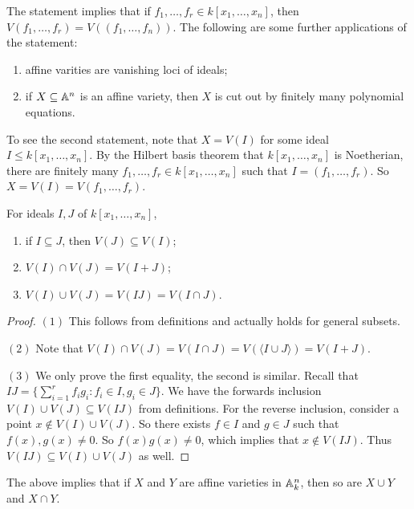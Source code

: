 \begin{remark}
  The statement implies that if
  $f_1, \dots, f_r \in k[x_1, \dots, x_n]$,
  then $V(f_1, \dots, f_r) = V((f_1, \dots, f_n))$.
  The following are some further
  applications of the statement:
  \begin{enumerate}
    \item affine varities are vanishing
      loci of ideals;
    \item if $X \subseteq \mathbb{A}^n$ is an
      affine variety, then $X$ is cut out
      by finitely many polynomial
      equations.
  \end{enumerate}
  To see the second statement, note that
  $X = V(I)$ for some ideal $I \le k[x_1, \dots, x_n]$.
  By the Hilbert basis theorem that
  $k[x_1, \dots, x_n]$ is Noetherian,
  there are finitely many
  $f_1, \dots, f_r \in k[x_1, \dots, x_n]$
  such that $I = (f_1, \dots, f_r)$.
  So $X = V(I) = V(f_1, \dots, f_r)$.
\end{remark}

\begin{prop}
  For ideals $I, J$ of $k[x_1, \dots, x_n]$,
  \begin{enumerate}
    \item if $I \subseteq J$, then
      $V(J) \subseteq V(I)$;
    \item $V(I) \cap V(J) = V(I + J)$;
    \item $V(I) \cup V(J) = V(IJ) = V(I \cap J)$.
  \end{enumerate}
\end{prop}

\begin{proof}
  $(1)$ This follows from definitions
  and actually holds for general subsets.

  $(2)$ Note that
  $V(I) \cap V(J) = V(I \cap J) = V(\langle I \cup J \rangle) = V(I + J)$.

  $(3)$
  We only prove the first equality, the
  second is similar.
  Recall that $IJ = \big\{{\sum_{i = 1}^r f_i g_i : f_i \in I, g_i \in J}\big\}$.
  We have the forwards inclusion
  $V(I) \cup V(J) \subseteq V(IJ)$ from
  definitions. For the reverse inclusion,
  consider a point $x \notin V(I) \cup V(J)$.
  So there exists $f \in I$ and
  $g \in J$ such that $f(x), g(x) \ne 0$.
  So $f(x)g(x) \ne 0$, which implies
  that $x \notin V(IJ)$. Thus
  $V(IJ) \subseteq V(I) \cup V(J)$ as well.
\end{proof}

\begin{remark}
  The above implies that if $X$ and $Y$
  are affine varieties in $\mathbb{A}^n_k$,
  then so are $X \cup Y$ and $X \cap Y$.
\end{remark}

